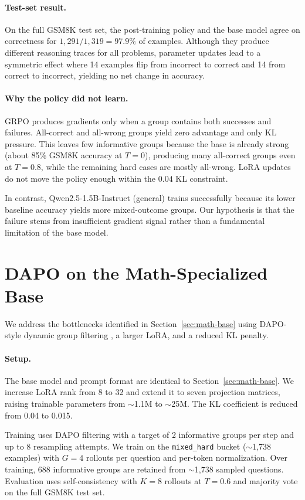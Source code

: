 \documentclass[11pt]{article}
\begin{document}
\paragraph{Test-set result.} On the full GSM8K test set, the post-training policy and the base model agree on correctness for $1{,}291/1{,}319 = 97.9\%$ of examples. Although they produce different reasoning traces for all problems, parameter updates lead to a symmetric effect where 14 examples flip from incorrect to correct and 14 from correct to incorrect, yielding no net change in accuracy.

\paragraph{Why the policy did not learn.}
GRPO produces gradients only when a group contains both successes and failures. All-correct and all-wrong groups yield zero advantage and only KL pressure. This leaves few informative groups because the base is already strong (about 85\% GSM8K accuracy at $T{=}0$), producing many all-correct groups even at $T{=}0.8$, while the remaining hard cases are mostly all-wrong. LoRA updates do not move the policy enough within the $0.04$ KL constraint.

\medskip
In contrast, Qwen2.5-1.5B-Instruct (general) trains successfully because its lower baseline accuracy yields more mixed-outcome groups. Our hypothesis is that the failure stems from insufficient gradient signal rather than a fundamental limitation of the base model.

\section{DAPO on the Math-Specialized Base}
\label{sec:dapo}

We address the bottlenecks identified in Section~\ref{sec:math-base} using DAPO-style dynamic group filtering \citep{yu2025dapo}, a larger LoRA, and a reduced KL penalty.

\paragraph{Setup.} The base model and prompt format are identical to Section~\ref{sec:math-base}. We increase LoRA rank from 8 to 32 and extend it to seven projection matrices, raising trainable parameters from $\sim$1.1M to $\sim$25M. The KL coefficient is reduced from 0.04 to 0.015.

\medskip
Training uses DAPO filtering with a target of 2 informative groups per step and up to 8 resampling attempts. We train on the \verb|mixed_hard| bucket ($\sim$1{,}738 examples) with $G{=}4$ rollouts per question and per-token normalization. Over training, 688 informative groups are retained from $\sim$1{,}738 sampled questions. Evaluation uses self-consistency with $K{=}8$ rollouts at $T{=}0.6$ and majority vote on the full GSM8K test set.
\end{document}
